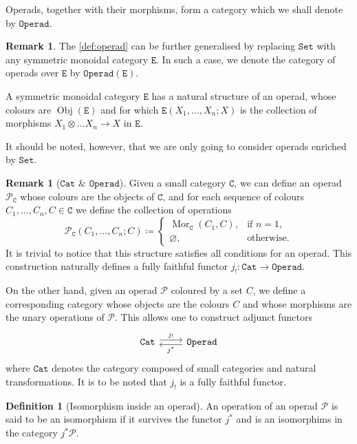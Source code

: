 \documentclass[11pt, reqno]{amsart}
\theoremstyle{definition}
\newtheorem{definition}[theorem]{Definition}
\newtheorem{remark}[theorem]{Remark}
\renewcommand{\emptyset}{\varnothing}
\newcommand{\cat}{\texttt}
\newcommand{\catfont}{\texttt}
\newcommand{\Set}{{\catfont{Set}}}          %
\newcommand{\Cat}{{\catfont{Cat}}}          %
\DeclareMathOperator{\Obj}{Obj}   %
\DeclareMathOperator{\Mor}{Mor}   %
\newcommand{\operad}{\mathcal}
\newcommand{\Operad}{{\catfont{Operad}}}
\begin{document}
Operads, together with their morphisms, form a category which we shall denote
by \(\Operad\).

\begin{remark}
\label{rem:operad-set-to-sym-mon-cat}
The \cref{def:operad} can be further generalised by replacing \(\Set\) with any
symmetric monoidal category \(\cat E\). In such a case, we denote the category
of operads over \(\cat E\) by \(\Operad(\cat E)\).

A symmetric monoidal category \(\cat E\) has a natural structure of an operad,
whose colours are \(\Obj(\cat E)\) and for which \(\cat E(X_1, \dots, X_n; X)\)
is the collection of morphisms \(X_1 \otimes \dots X_n \to X\) in \(\cat E\).

It should be noted, however, that we are only going to consider operads
enriched by \(\Set\).
\end{remark}

\begin{remark}[\(\Cat\) \& \(\Operad\)]
\label{rem:operad-from-a-category}
Given a small category \(\cat C\), we can define an operad \(\operad P_{\cat C}\)
whose colours are the objects of \(\cat C\), and for each sequence of colours
\(C_1, \dots, C_n, C \in \cat C\) we define the collection of operations
\[
\operad P_{\cat C}(C_1, \dots, C_n; C) \coloneq
\begin{cases}
  \Mor_{\cat C}(C_1, C), &\text{if } n = 1, \\
  \emptyset, &\text{otherwise}.
\end{cases}
\]
It is trivial to notice that this structure satisfies all conditions for an
operad. This construction naturally defines a fully faithful functor \(j_!:
\Cat \to \Operad\).

On the other hand, given an operad \(\operad P\) coloured by a set \(C\), we
define a corresponding category whose objects are the colours \(C\) and whose
morphisms are the unary operations of \(\operad P\). This allows one to
construct adjunct functors
\[
    \begin{tikzcd}
        \Cat \ar[r, shift left, "j_{!}"] &\Operad \ar[l, shift left, "j^{*}"]
    \end{tikzcd}
\]
where \(\Cat\) denotes the category composed of small categories and natural
transformations. It is to be noted that \(j_!\) is a fully faithful functor.
\end{remark}

\begin{definition}[Isomorphism inside an operad]
An operation of an operad \(\operad P\) is said to be an isomorphism if it
survives the functor \(j^*\) and is an isomorphims in the category \(j^*
\operad P\).
\end{definition}
\end{document}
